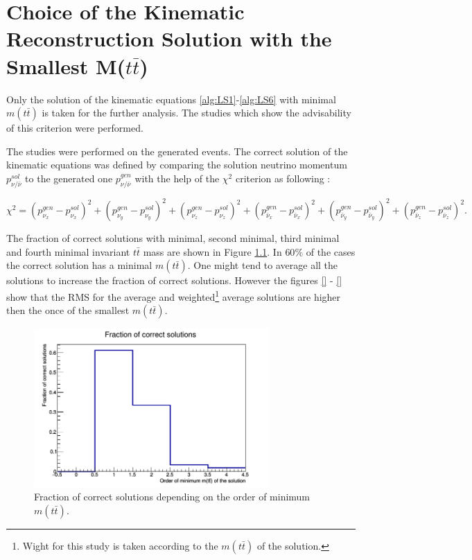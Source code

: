 \chapter{Choice of the Kinematic Reconstruction Solution with the Smallest M($t\bar{t}$)}\label{appendix:mtt}

Only the solution of the kinematic equations \ref{alg:LS1}-\ref{alg:LS6} with minimal $m(t\bar{t})$ is taken for the further analysis.
The studies which show the advisability of this criterion were performed.

The studies were performed on the generated events. The correct solution of the kinematic equations was defined by comparing the 
solution neutrino momentum $p_{\nu/\bar{\nu}}^{sol}$ to the generated one $p_{\nu/\bar{\nu}}^{gen}$ with the help of the $\chi^{2}$ criterion as following \cite{Sonnenschein:2005ed}:

\begin{equation}
 \chi^{2} = (p_{\nu_{x}}^{gen} - p_{\nu_{x}}^{sol})^{2} + (p_{\nu_{y}}^{gen} - p_{\nu_{y}}^{sol})^{2} + (p_{\nu_{z}}^{gen} - p_{\nu_{z}}^{sol})^{2} + (p_{\bar{\nu}_{x}}^{gen} - p_{\bar{\nu}_{x}}^{sol})^{2} +
 (p_{\bar{\nu}_{y}}^{gen} - p_{\bar{\nu}_{y}}^{sol})^{2} + (p_{\bar{\nu}_{z}}^{gen} - p_{\bar{\nu}_{z}}^{sol})^{2}.
\end{equation}

The fraction of correct solutions with minimal, second minimal, third minimal and fourth minimal invariant $t\bar{t}$ mass are shown in Figure \ref{fig:corrMinMtt}. In $60\%$ of 
the cases the correct solution has a minimal $m(t\bar{t})$. One might tend to average all the solutions to increase the fraction of correct solutions. However the figures \ref{} - \ref{}
show that the RMS for the average and weighted\footnote{Wight for this study is taken according to the $m(t\bar{t})$ of the solution.} average solutions are higher then the once
of the smallest $m(t\bar{t})$.

\begin{figure}[t]
  \centering
  \includegraphics[width=0.8\textwidth]{10_appendices/min_Mtt/plots/corrMinMtt.png}
  \caption{Fraction of correct solutions depending on the order of minimum $m(t\bar{t})$.}
  \label{fig:corrMinMtt}
\end{figure}

